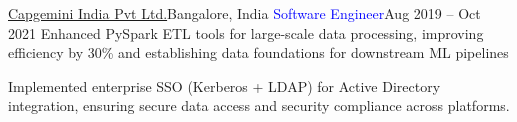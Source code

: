 
          

      \resumeItemListEnd
      
    \resumeSubheading
      {\href{https://drive.google.com/file/d/1n0uYAw9foyXEYLjLYKpWT3szMy8oMVQK/view}{Capgemini India Pvt Ltd.}}{Bangalore, India}
      {\textcolor{Blue}{Software Engineer}}{Aug 2019 -- Oct 2021}
      \resumeItemListStart
          {Enhanced PySpark ETL tools for large-scale data processing, improving efficiency by 30\% and establishing data foundations for downstream ML pipelines}
      
        {Implemented enterprise SSO (Kerberos + LDAP) for Active Directory integration, ensuring secure data access and security compliance across platforms.}
        
      \resumeItemListEnd
   
  \resumeSubHeadingListEnd